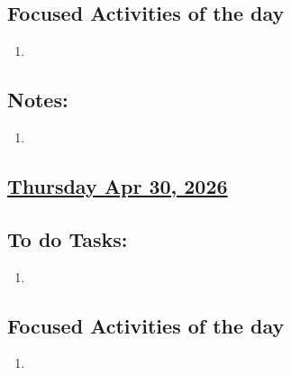 \subsection*{Focused Activities of the day}
\begin{enumerate}[\ding{212}]  
    \item  
\end{enumerate}
\subsection*{Notes:}
\begin{enumerate}
    \item 
\end{enumerate}
\subsection*{\underline{Thursday Apr 30, 2026}}
\subsection*{To do Tasks:}
\begin{enumerate}
    \item 
\end{enumerate}
\subsection*{Focused Activities of the day}
\begin{enumerate}[\ding{212}]  
    \item 
\end{enumerate}
